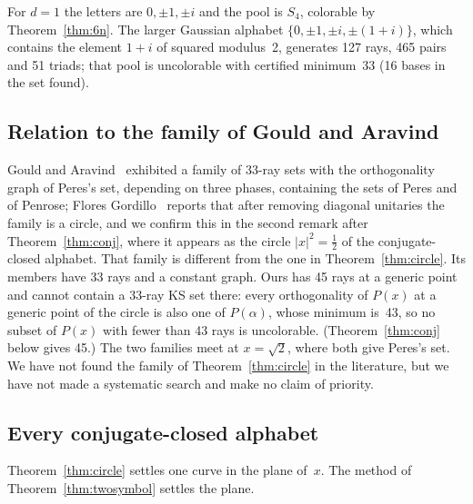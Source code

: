 For $d=1$ the letters are $0,\pm1,\pm i$ and the pool is $S_4$, colorable by
Theorem~\ref{thm:6n}.  The larger Gaussian alphabet $\{0,\pm1,\pm i,\pm(1+i)\}$, which contains
the element $1+i$ of squared modulus~2, generates 127 rays, 465 pairs and 51 triads; that pool is
uncolorable with certified minimum~33 (16 bases in the set found).

\subsection{Relation to the family of Gould and Aravind}

Gould and Aravind~\cite{GouldAravind2010} exhibited a family of 33-ray sets with the
orthogonality graph of Peres's set, depending on three phases, containing the sets of Peres and
of Penrose; Flores Gordillo~\cite{FloresGordillo2026} reports that after removing diagonal
unitaries the family is a circle, and we confirm this in the second remark after
Theorem~\ref{thm:conj}, where it appears as the circle $|x|^2=\tfrac12$ of the conjugate-closed
alphabet.  That family is different from the one in
Theorem~\ref{thm:circle}.  Its members have 33 rays and a constant graph.  Ours has 45 rays at a
generic point and cannot contain a 33-ray KS set there: every orthogonality of $P(x)$ at a generic
point of the circle is also one of $P(\alpha)$, whose minimum is~43, so no subset of $P(x)$ with
fewer than 43 rays is uncolorable.  (Theorem~\ref{thm:conj} below gives 45.)  The two families meet at $x=\sqrt2$, where both give Peres's
set.  We have not found the family of Theorem~\ref{thm:circle} in the literature, but we have not
made a systematic search and make no claim of priority.

\subsection{Every conjugate-closed alphabet}\label{sec:conjclosed}

Theorem~\ref{thm:circle} settles one curve in the plane of~$x$.  The method of
Theorem~\ref{thm:twosymbol} settles the plane.

